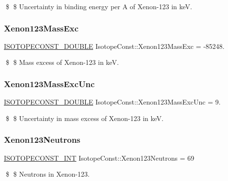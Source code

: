 \$ \$ Uncertainty in binding energy per A of Xenon-\/123 in keV. \mbox{\label{group___isotope_const-_xenon-_xe123_gae159136ff86aca7b381b89e075a0ce33}} 
\subsubsection{\texorpdfstring{Xenon123\+Mass\+Exc}{Xenon123MassExc}}
{\footnotesize\ttfamily \mbox{\hyperlink{group___isotope_const-_macros_ga8f45a7272ce02c0b4c65c44636ed719a}{I\+S\+O\+T\+O\+P\+E\+C\+O\+N\+S\+T\+\_\+\+D\+O\+U\+B\+LE}} Isotope\+Const\+::\+Xenon123\+Mass\+Exc = -\/85248.}

\$ \$ Mass excess of Xenon-\/123 in keV. \mbox{\label{group___isotope_const-_xenon-_xe123_ga1953968ab0df2d8c940d7ae461ac83ba}} 
\subsubsection{\texorpdfstring{Xenon123\+Mass\+Exc\+Unc}{Xenon123MassExcUnc}}
{\footnotesize\ttfamily \mbox{\hyperlink{group___isotope_const-_macros_ga8f45a7272ce02c0b4c65c44636ed719a}{I\+S\+O\+T\+O\+P\+E\+C\+O\+N\+S\+T\+\_\+\+D\+O\+U\+B\+LE}} Isotope\+Const\+::\+Xenon123\+Mass\+Exc\+Unc = 9.}

\$ \$ Uncertainty in mass excess of Xenon-\/123 in keV. \mbox{\label{group___isotope_const-_xenon-_xe123_gab631a0a86953da729d999cdcead2d93b}} 
\subsubsection{\texorpdfstring{Xenon123\+Neutrons}{Xenon123Neutrons}}
{\footnotesize\ttfamily \mbox{\hyperlink{group___isotope_const-_macros_ga5f18360b3e99483a35c32d789e62621c}{I\+S\+O\+T\+O\+P\+E\+C\+O\+N\+S\+T\+\_\+\+I\+NT}} Isotope\+Const\+::\+Xenon123\+Neutrons = 69}

\$ \$ Neutrons in Xenon-\/123. \mbox{\label{group___isotope_const-_xenon-_xe123_ga771385ab056d3fb3c7a67051a9ec1f5e}} 
